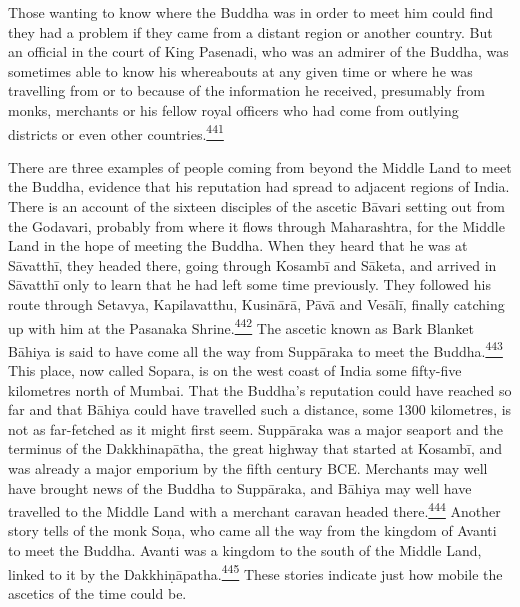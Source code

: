 Those wanting to know where the Buddha was in order to meet him could
find they had a problem if they came from a distant region or another
country. But an official in the court of King Pasenadi, who was an
admirer of the Buddha, was sometimes able to know his whereabouts at any
given time or where he was travelling from or to because of the
information he received, presumably from monks, merchants or his fellow
royal officers who had come from outlying districts or even other
countries.\label{footprints_split_012.html_fnref441}\hyperref[footprints_split_025.htmlux5cux23fn441]{\textsuperscript{441}}

There are three examples of people coming from beyond the Middle Land to
meet the Buddha, evidence that his reputation had spread to adjacent
regions of India. There is an account of the sixteen disciples of the
ascetic Bāvari setting out from the Godavari, probably from where it
flows through Maharashtra, for the Middle Land in the hope of meeting
the Buddha. When they heard that he was at Sāvatthī, they headed there,
going through Kosambī and Sāketa, and arrived in Sāvatthī only to learn
that he had left some time previously. They followed his route through
Setavya, Kapilavatthu, Kusinārā, Pāvā and Vesālī, finally catching up
with him at the Pasanaka
Shrine.\label{footprints_split_012.html_fnref442}\hyperref[footprints_split_025.htmlux5cux23fn442]{\textsuperscript{442}}
The ascetic known as Bark Blanket Bāhiya is said to have come all the
way from Suppāraka to meet the
Buddha.\label{footprints_split_012.html_fnref443}\hyperref[footprints_split_025.htmlux5cux23fn443]{\textsuperscript{443}}
This place, now called Sopara, is on the west coast of India some
fifty-five kilometres north of Mumbai. That the Buddha's reputation
could have reached so far and that Bāhiya could have travelled such a
distance, some 1300 kilometres, is not as far-fetched as it might first
seem. Suppāraka was a major seaport and the terminus of the
Dakkhinapātha, the great highway that started at Kosambī, and was
already a major emporium by the fifth century BCE. Merchants may well
have brought news of the Buddha to Suppāraka, and Bāhiya may well have
travelled to the Middle Land with a merchant caravan headed
there.\label{footprints_split_012.html_fnref444}\hyperref[footprints_split_025.htmlux5cux23fn444]{\textsuperscript{444}}
Another story tells of the monk Soṇa, who came all the way from the
kingdom of Avanti to meet the Buddha. Avanti was a kingdom to the south
of the Middle Land, linked to it by the
Dakkhiṇāpatha.\label{footprints_split_012.html_fnref445}\hyperref[footprints_split_025.htmlux5cux23fn445]{\textsuperscript{445}}
These stories indicate just how mobile the ascetics of the time could
be.

